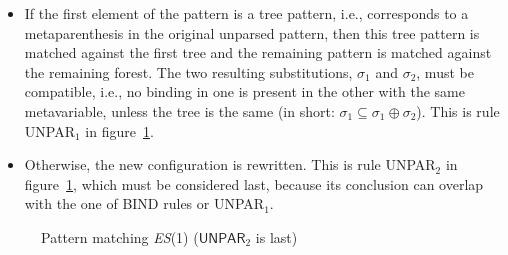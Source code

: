 \begin{itemize}
\begin{itemize}
      \item If the first element of the pattern is a tree pattern,
      i.e., corresponds to a meta\-parenthesis in the original
      unparsed pattern, then this tree pattern is matched against the
      first tree and the remaining pattern is matched against the
      remaining forest. The two resulting substitutions, \(\sigma_1\)
      and \(\sigma_2\), must be compatible, i.e., no binding in one is
      present in the other with the same meta\-variable, unless the
      tree is the same (in short: \(\sigma_1 \subseteq \sigma_1 \oplus
      \sigma_2\)). This is rule \textsf{UNPAR}\(_1\) in
      figure~\ref{es1_match_def}.

      \item Otherwise, the new configuration is rewritten. This is
      rule \textsf{UNPAR}\(_2\) in figure~\ref{es1_match_def}, which
      must be considered last, because its conclusion can overlap with
      the one of \textsf{BIND} rules or \textsf{UNPAR}\(_1\).

    \end{itemize}

\end{itemize}

\begin{figure}[H]
\caption{Pattern matching \textit{ES}(1)
(\(\textsf{UNPAR}_2\) is last)
\label{es1_match_def}}
\end{figure}

